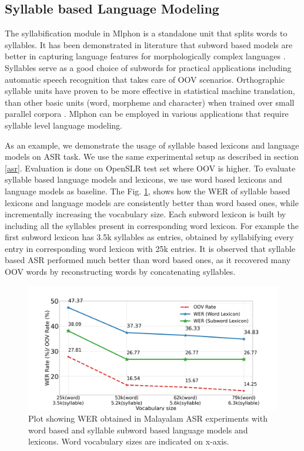 \documentclass{ieeeaccess}
\begin{document}
\subsection{Syllable based Language Modeling}


The syllabification module in Mlphon is a standalone unit that splits words to syllables. It has been demonstrated in literature that subword based models are better in capturing language features for morphologically complex languages \cite{SMIT2021101158}. Syllables serve as a good choice of subwords for practical applications including automatic speech recognition \cite{adiga-etal-2021-automatic} that takes care of OOV scenarios. Orthographic syllable units have proven to be more effective in statistical machine translation, than other basic units (word, morpheme and character) when trained over small parallel corpora  \cite{kunchukuttan2016}. Mlphon can be employed in  various applications that require syllable level language modeling.


As an example, we demonstrate the usage of syllable based lexicons and language models on ASR task. We use the same experimental setup as described in section \ref{asr}. Evaluation is done on OpenSLR test set where OOV is higher. To evaluate syllable based language models and lexicons, we use word based lexicons and language models as baseline. The Fig. \ref{subword}, shows how the WER of syllable  based lexicons and language models are consistently better than word based ones,  while incrementally increasing the vocabulary size. Each subword lexicon is built by including all the syllables present in corresponding word lexicon. For example the first subword lexicon has 3.5k syllables as entries, obtained by syllabifying every entry in corresponding word lexicon with 25k entries. It is observed that syllable based ASR performed much better than word based ones, as it recovered many OOV words by reconstructing words by concatenating syllables. 




\begin{figure}[h]

		\centering
		\includegraphics[width=\linewidth]{trigramT2.png}
	\caption{Plot showing WER obtained in Malayalam ASR experiments with word based and syllable subword based language models and lexicons. Word vocabulary sizes are indicated on x-axis.}
			\label{subword}
%
\end{figure}
\end{document}
